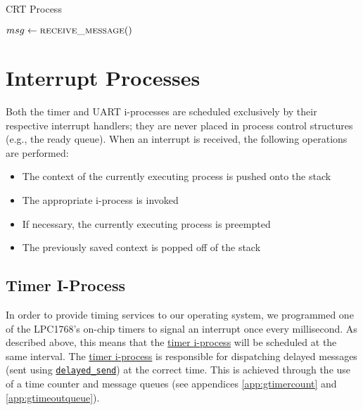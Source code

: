 \documentclass[12pt]{report}
\begin{document}
\begin{algorithm}
\caption{CRT Process}
\label{alg:crtprocess}
\begin{algorithmic}[1]
        \State $msg \leftarrow \Call{receive\_message}{\null}$
            \State {}
        \Else
            \State {}
        \EndIf
    \EndWhile
\EndProcedure
\end{algorithmic}
\end{algorithm}

\section{Interrupt Processes}

Both the timer and UART i-processes are scheduled exclusively by their respective interrupt handlers; they are never placed in process control structures (e.g., the ready queue). When an interrupt is received, the following operations are performed:

\begin{itemize}

\item The context of the currently executing process is pushed onto the stack
\item The appropriate i-process is invoked
\item If necessary, the currently executing process is preempted
\item The previously saved context is popped off of the stack

\end{itemize}

\subsection{Timer I-Process}
\label{subsec:Timer I-Process}

In order to provide timing services to our operating system, we programmed one of the LPC1768's on-chip timers to signal an interrupt once every millisecond. As described above, this means that the \hyperref[alg:timeriprocess]{timer i-process} will be scheduled at the same interval. The \hyperref[alg:timeriprocess]{timer i-process} is responsible for dispatching delayed messages (sent using \hyperref[alg:sendingdelayedmessages]{\texttt{delayed_send}}) at the correct time. This is achieved through the use of a time counter and message queues (see appendices \ref{app:gtimercount} and \ref{app:gtimeoutqueue}).\\
\end{document}
